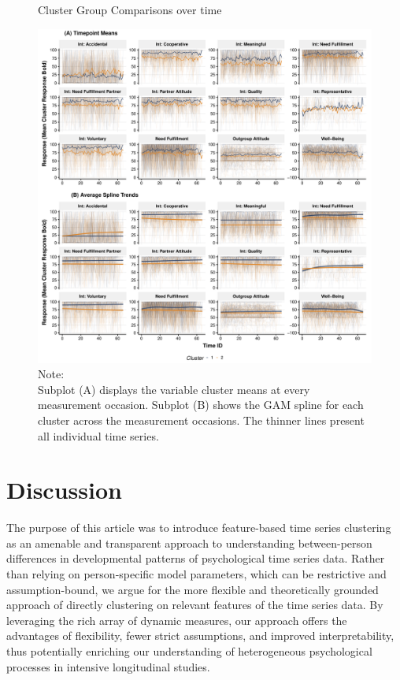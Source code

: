 \documentclass[man, 12pt, a4paper, floatsintext]{apa7}
\theoremstyle{break}
\theoremstyle{plain}
\begin{document}
\begin{figure}[!ht] %
  \caption{Cluster Group Comparisons over time}
  \label{fig:clusterTs}
  \centering\includegraphics[width=\textwidth]{figures/clusterTsComb.pdf}
  \caption*{Note: \\
  Subplot (A) displays the variable cluster means at every measurement occasion. Subplot (B) shows the GAM spline for each cluster across the measurement occasions. The thinner lines present all individual time series.}
\end{figure}


\newpage
\section{Discussion}
The purpose of this article was to introduce feature-based time series clustering as an amenable and transparent approach to understanding between-person differences in developmental patterns of psychological time series data. Rather than relying on person-specific model parameters, which can be restrictive and assumption-bound, we argue for the more flexible and theoretically grounded approach of directly clustering on relevant features of the time series data. By leveraging the rich array of dynamic measures, our approach offers the advantages of flexibility, fewer strict assumptions, and improved interpretability, thus potentially enriching our understanding of heterogeneous psychological processes in intensive longitudinal studies.
\end{document}
